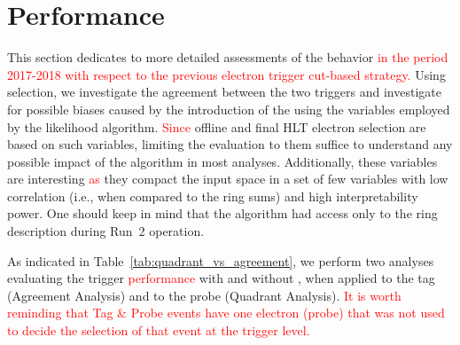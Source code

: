 
\chapter{\rnn{} Performance}%
\label{sec:off_ana}

This section dedicates to more detailed assessments of the \rnn{} behavior 
\textcolor{red}{in the period 2017-2018 with respect to the previous electron trigger cut-based strategy.}
Using \Zee{} \tnp{}
selection, we investigate the agreement between the two triggers and investigate
for possible biases caused by the introduction of the \rnn{} using the variables
employed by the likelihood algorithm. \textcolor{red}{Since} offline and final HLT electron
selection are based on such variables, limiting the evaluation to them suffice
to understand any possible impact of the \rnn{} algorithm in most analyses.
Additionally, these variables are interesting \textcolor{red}{as} they compact the input space
in a set of few variables with low correlation (i.e., when compared to the ring
sums) and high interpretability power. One should keep in mind that the \rnn{}
algorithm had access only to the ring description during Run~2 operation.

As indicated in
Table~\ref{tab:quadrant_vs_agreement}, we perform two analyses evaluating the
trigger \textcolor{red}{performance} with and without \rnn{}, when applied to the tag (Agreement Analysis) and
to the probe (Quadrant Analysis).
\textcolor{red}{ It is worth reminding that Tag \& Probe events have one electron (probe) that was not used to decide the selection of that event at the trigger level.
}

\begin{table}[ht!]\footnotesize
\centering
\caption{Customized \Zee{} \tap{} selection criteria employed in the
agreement and quadrant analyses \textcolor{red}{in the Run 2 (2017-2018 period)}.}%
\label{tab:quadrant_vs_agreement}
\end{table}

